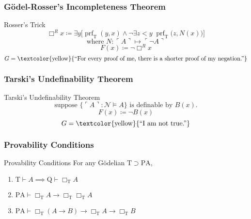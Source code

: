\documentclass[UTF8,aspectratio=43,11pt,colorlinks,compress,openany]{beamer}%
\begin{document}
\begin{frame}\frametitle{G\"odel-Rosser's Incompleteness Theorem}
\setlength\abovedisplayskip{0pt}
\setlength\belowdisplayskip{0pt}\vspace{-1ex}
	\begin{block}{Rosser's Trick}
		\[\Box ^R x\coloneqq \exists y\big[\operatorname{prf}_{\mathrm{T}}(y,x)\wedge\neg\exists z<y\;\operatorname{prf}_{\mathrm{T}}\big(z,N(x)\big)\big]\]
		\[\text{where } N:\ulcorner A\urcorner\mapsto\ulcorner\neg A\urcorner\]
		\[F(x)\coloneqq \neg\Box ^R x\]
		\[G=\text{\textcolor{yellow}{``For every proof of me, there is a shorter proof of my negation.''}}\]
	\end{block}
\end{frame}

\begin{frame}\frametitle{Tarski's Undefinability Theorem}
	\begin{block}{Tarski's Undefinability Theorem}
		\[\text{suppose $\big\{\ulcorner A\urcorner:\mathcal{N}\vDash A\big\}$ is definable by $B(x)$.}\]
		\[F(x)\coloneqq \neg B(x)\]
		\[G=\text{\textcolor{yellow}{``I am not true.''}}\]
	\end{block}
\end{frame}

\begin{frame}\frametitle{Provability Conditions}
		\begin{block}{Provability Conditions}
			For any G\"odelian $\mathrm{T}\supset \mathrm{PA} $,
			\begin{enumerate}
				\item $\mathrm{T}\vdash A\implies \mathrm{Q}\vdash\Box_{\mathrm{T}}A$
				\item $\mathrm{PA}\vdash\Box_{\mathrm{T}}A\to\Box_{\mathrm{T}}\Box_{\mathrm{T}}A$
				\item $\mathrm{PA}\vdash\Box_{\mathrm{T}}(A\to B)\to\Box_{\mathrm{T}}A\to\Box_{\mathrm{T}}B$
			\end{enumerate}
		\end{block}
\end{frame}
\end{document}
